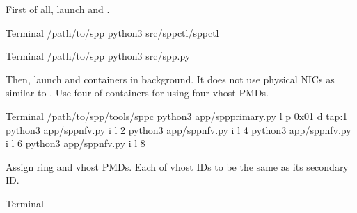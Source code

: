 \documentclass[a4paper,11pt,openany,oneside,english]{sphinxmanual}
\begin{document}
First of all, launch  and .

\begin{sphinxVerbatim}[commandchars=\\\{\},formatcom=\footnotesize]
 Terminal 
  /path/to/spp
 python3 src/spp\PYGZhy{}ctl/spp\PYGZhy{}ctl

 Terminal 
  /path/to/spp
 python3 src/spp.py
\end{sphinxVerbatim}

Then, launch  and  containers in background.
It does not use physical NICs as similar to
{\hyperref[\detokenize{tools/sppc/usecases:sppc-usecases-test-vhost-single}]{}}.
Use four of  containers for using four vhost PMDs.

\begin{sphinxVerbatim}[commandchars=\\\{\},formatcom=\footnotesize]
 Terminal 
  /path/to/spp/tools/sppc
 python3 app/spp\PYGZhy{}primary.py \PYGZhy{}l  \PYGZhy{}p 0x01 \PYGZhy{}d tap:1
 python3 app/spp\PYGZhy{}nfv.py \PYGZhy{}i  \PYGZhy{}l \PYGZhy{}2
 python3 app/spp\PYGZhy{}nfv.py \PYGZhy{}i  \PYGZhy{}l \PYGZhy{}4
 python3 app/spp\PYGZhy{}nfv.py \PYGZhy{}i  \PYGZhy{}l \PYGZhy{}6
 python3 app/spp\PYGZhy{}nfv.py \PYGZhy{}i  \PYGZhy{}l \PYGZhy{}8
\end{sphinxVerbatim}

Assign ring and vhost PMDs. Each of vhost IDs to be the same as
its secondary ID.

\begin{sphinxVerbatim}[commandchars=\\\{\},formatcom=\footnotesize]
 Terminal 
\end{sphinxVerbatim}
\end{document}
